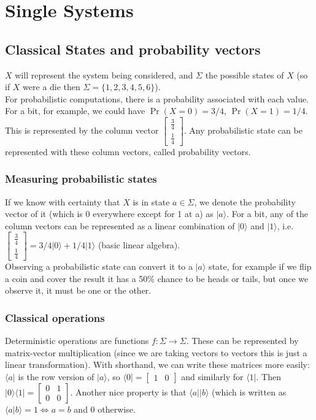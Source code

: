\documentclass{amsart}
\begin{document}
\section*{Single Systems}
\subsection*{Classical States and probability vectors}
$ X $ will represent the system being considered, and $ \Sigma $ the possible states of $ X $
(so if $ X $ were a die then $ \Sigma = \{1,2,3,4,5,6\} $). \\
For probabilistic computations, there is a probability associated with each value. For a bit,
for example, we could have $ \Pr(X=0)=3/4 $, $ \Pr(X=1) = 1/4 $. This is represented by the
column vector $ \begin{bmatrix} \frac{3}{4} \\ \frac{1}{4} \end{bmatrix} $. Any probabilistic
state can be represented with these column vectors, called probability vectors. \\
\subsubsection*{Measuring probabilistic states}
If we know with certainty that $ X $ is in state $ a \in \Sigma $, we denote the probability
vector of it (which is 0 everywhere except for 1 at a) as $ |a\rangle $. For a bit, any of the
column vectors can be represented as a linear combination of $ |0\rangle $ and
$ |1\rangle $, i.e. $ \begin{bmatrix} \frac{3}{4} \\ \frac{1}{4} \end{bmatrix} =
3/4 |0\rangle + 1/4 |1\rangle $ (basic linear algebra). \\
Observing a probabilistic state can convert it to a $ |a\rangle $ state, for example if we
flip a coin and cover the result it has a 50\% chance to be heads or tails, but once we
observe it, it must be one or the other. \\
\subsubsection*{Classical operations}
Deterministic operations are functions $ f : \Sigma \to \Sigma $. These can be represented by
matrix-vector multiplication (since we are taking vectors to vectors this is just a linear
transformation). With shorthand, we can write these matrices more easily: $ \langle a| $ is
the row version of $ |a\rangle $, so $ \langle 0| = \begin{bmatrix} 1 & 0 \end{bmatrix} $ and
similarly for $ \langle 1| $. Then $ |0\rangle \langle 1| = \begin{bmatrix}
0 & 1 \\ 0 & 0 \end{bmatrix} $. Another nice property is that $ \langle a| | b \rangle $
(which is written as $ \langle a|b \rangle = 1 \iff a = b $ and 0 otherwise. \\
\end{document}
